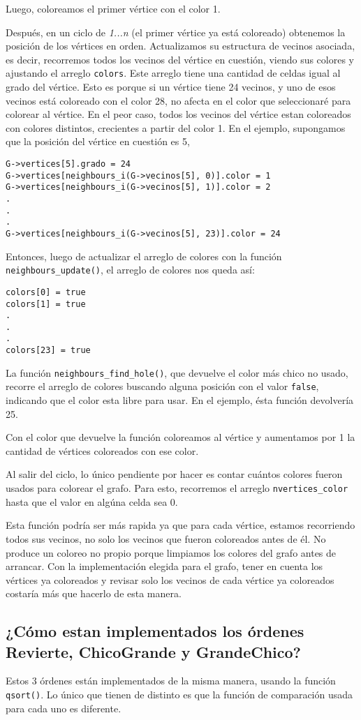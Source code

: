 \documentclass[11pt]{article}   	%
\begin{document}
Luego, coloreamos el primer vértice con el color 1.

Después, en un ciclo de \emph{1...n} (el primer vértice ya está coloreado) obtenemos la posición de los
vértices en orden. Actualizamos su estructura de vecinos asociada, es decir, recorremos todos los vecinos
del vértice en cuestión, viendo sus colores y ajustando el arreglo \texttt{colors}. Este arreglo tiene
una cantidad de celdas igual al grado del vértice. Esto es porque si un vértice tiene 24 vecinos, y uno de
esos vecinos está coloreado con el color 28, no afecta en el color que seleccionaré para colorear al vértice.
En el peor caso, todos los vecinos del vértice estan coloreados con colores distintos, crecientes a partir
del color 1. En el ejemplo, supongamos que la posición del vértice en cuestión es 5,
\lstset{style=customC}
\begin{lstlisting}
G->vertices[5].grado = 24
G->vertices[neighbours_i(G->vecinos[5], 0)].color = 1
G->vertices[neighbours_i(G->vecinos[5], 1)].color = 2
.
.
.
G->vertices[neighbours_i(G->vecinos[5], 23)].color = 24
\end{lstlisting}
Entonces, luego de actualizar el arreglo de colores con la función \texttt{neighbours\_update()}, el arreglo
de colores nos queda así:
\begin{lstlisting}
colors[0] = true
colors[1] = true
.
.
.
colors[23] = true
\end{lstlisting}
La función \texttt{neighbours\_find\_hole()}, que devuelve el color más chico no usado, recorre el arreglo
de colores buscando alguna posición con el valor \texttt{false}, indicando que el color esta libre para
usar. En el ejemplo, ésta función devolvería 25. 

Con el color que devuelve la función coloreamos al vértice y aumentamos por 1 la cantidad de vértices
coloreados con ese color.

Al salir del ciclo, lo único pendiente por hacer es contar cuántos colores fueron usados para colorear
el grafo. Para esto, recorremos el arreglo \texttt{nvertices\_color} hasta que el valor en algúna celda
sea 0.

Esta función podría ser más rapida ya que para cada vértice, estamos recorriendo todos sus vecinos, no solo
los vecinos que fueron coloreados antes de él. No produce un coloreo no propio porque limpiamos los colores
del grafo antes de arrancar. Con la implementación elegida para el grafo, tener en cuenta los vértices ya
coloreados y revisar solo los vecinos de cada vértice ya coloreados costaría más que hacerlo de esta manera.
\subsection{¿Cómo estan implementados los órdenes Revierte, ChicoGrande y GrandeChico?}
Estos 3 órdenes están implementados de la misma manera, usando la función \texttt{qsort()}. Lo único que
tienen de distinto es que la función de comparación usada para cada uno es diferente.
\end{document}
